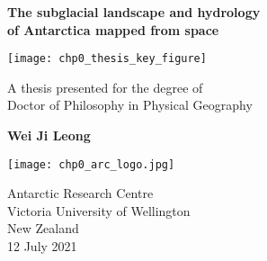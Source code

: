 \begin{titlepage}
  \begin{center}

    \LARGE
    \textbf{
      The subglacial landscape and hydrology \\
      of Antarctica mapped from space
    }

    \texttt{[image: chp0\_thesis\_key\_figure]}

    \Large
    A thesis presented for the degree of\\
    Doctor of Philosophy in Physical Geography

    \vspace{0.8cm}

    \textbf{Wei Ji Leong}

    \texttt{[image: chp0\_arc\_logo.jpg]}

    \Large
    Antarctic Research Centre\\
    Victoria University of Wellington\\
    New Zealand\\
    12 July 2021

  \end{center}
\end{titlepage}

